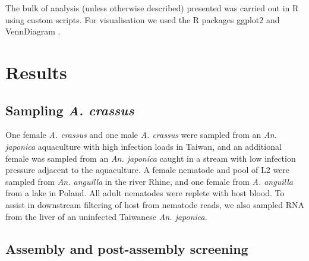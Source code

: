\documentclass[10pt]{bmc_article}
\newenvironment{bmcformat}{\begin{raggedright}\baselineskip20pt\sloppy\setboolean{publ}{false}}{\end{raggedright}\baselineskip20pt\sloppy}
\begin{document}
\begin{bmcformat}
The bulk of analysis (unless otherwise described) presented was
carried out in R \cite{R_project} using custom scripts. For
visualisation we used the R packages ggplot2 \cite{ggplot-book} and
VennDiagram \cite{pmid21269502}.


\section*{Results}


\subsection*{Sampling \textit{A. crassus}}


One female \textit{A. crassus} and one male \textit{A. crassus} were
sampled from an \textit{An. japonica} aquaculture with high infection
loads in Taiwan, and an additional female was sampled from an
\textit{An. japonica} caught in a stream with low infection pressure
adjacent to the aquaculture. A female nematode and pool of L2 were
sampled from \textit{An. anguilla} in the river Rhine, and one female
from \textit{A. anguilla} from a lake in Poland. All adult nematodes
were replete with host blood. To assist in downstream filtering of
host from nematode reads, we also sampled RNA from the liver of an
uninfected Taiwanese \textit{An. japonica}.







\subsection*{Assembly and post-assembly screening}



\end{bmcformat}
\end{document}

